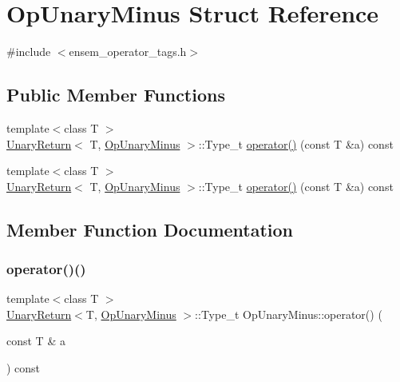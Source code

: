 \hypertarget{structOpUnaryMinus}{}\section{Op\+Unary\+Minus Struct Reference}
\label{structOpUnaryMinus}


{\ttfamily \#include $<$ensem\+\_\+operator\+\_\+tags.\+h$>$}

\subsection*{Public Member Functions}
\begin{DoxyCompactItemize}
\item 
{\footnotesize template$<$class T $>$ }\\\mbox{\hyperlink{structUnaryReturn}{Unary\+Return}}$<$ T, \mbox{\hyperlink{structOpUnaryMinus}{Op\+Unary\+Minus}} $>$\+::Type\+\_\+t \mbox{\hyperlink{structOpUnaryMinus_a76748f9d3b2f6a7bebac4a7427f86e3d}{operator()}} (const T \&a) const
\item 
{\footnotesize template$<$class T $>$ }\\\mbox{\hyperlink{structUnaryReturn}{Unary\+Return}}$<$ T, \mbox{\hyperlink{structOpUnaryMinus}{Op\+Unary\+Minus}} $>$\+::Type\+\_\+t \mbox{\hyperlink{structOpUnaryMinus_a76748f9d3b2f6a7bebac4a7427f86e3d}{operator()}} (const T \&a) const
\end{DoxyCompactItemize}


\subsection{Member Function Documentation}
\mbox{\label{structOpUnaryMinus_a76748f9d3b2f6a7bebac4a7427f86e3d}} 
\subsubsection{\texorpdfstring{operator()()}{operator()()}\hspace{0.1cm}{\footnotesize\ttfamily [1/2]}}
{\footnotesize\ttfamily template$<$class T $>$ \\
\mbox{\hyperlink{structUnaryReturn}{Unary\+Return}}$<$T, \mbox{\hyperlink{structOpUnaryMinus}{Op\+Unary\+Minus}} $>$\+::Type\+\_\+t Op\+Unary\+Minus\+::operator() (\begin{DoxyParamCaption}\item[{const T \&}]{a }\end{DoxyParamCaption}) const\hspace{0.3cm}{\ttfamily [inline]}}

